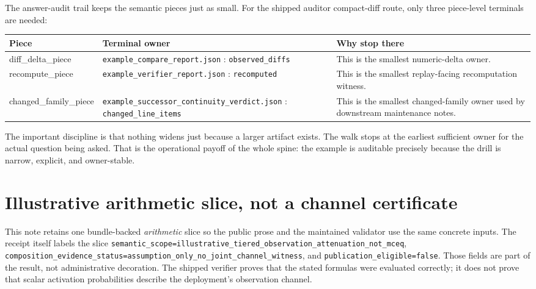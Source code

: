 \documentclass[11pt]{article}
\begin{document}
The answer-audit trail keeps the semantic pieces just as small.
For the shipped auditor compact-diff route, only three piece-level terminals are needed:
\begin{center}
\small
\begin{tabularx}{0.97\linewidth}{@{}Y Y Y@{}}
\toprule
Piece & Terminal owner & Why stop there \\
\midrule
diff\_delta\_piece & \texttt{example\_compare\_report.json} : \texttt{observed\_diffs} & This is the smallest numeric-delta owner. \\
recompute\_piece & \texttt{example\_verifier\_report.json} : \texttt{recomputed} & This is the smallest replay-facing recomputation witness. \\
changed\_family\_piece & \texttt{example\_successor\_continuity\_verdict.json} : \texttt{changed\_line\_items} & This is the smallest changed-family owner used by downstream maintenance notes. \\
\bottomrule
\end{tabularx}
\end{center}
\vspace{-0.5em}

\noindent The important discipline is that nothing widens just because a larger artifact exists.
The walk stops at the earliest sufficient owner for the actual question being asked.
That is the operational payoff of the whole spine: the example is auditable precisely because the drill is narrow, explicit, and owner-stable.

\section{Illustrative arithmetic slice, not a channel certificate}
\label{sec:numerical}
This note retains one bundle-backed \emph{arithmetic} slice so the public prose and the maintained validator use the same concrete inputs. The receipt itself labels the slice
\nolinkurl{semantic_scope=illustrative_tiered_observation_attenuation_not_mceq},
\nolinkurl{composition_evidence_status=assumption_only_no_joint_channel_witness}, and
\nolinkurl{publication_eligible=false}.
Those fields are part of the result, not administrative decoration. The shipped verifier proves that the stated formulas were evaluated correctly; it does not prove that scalar activation probabilities describe the deployment's observation channel.\cite{series:auditorreplay,series:obsatten}
\end{document}

